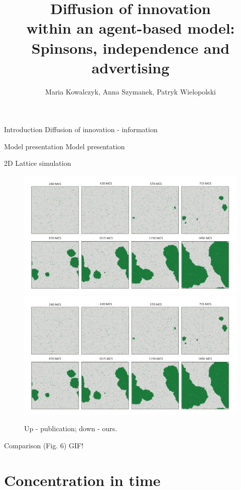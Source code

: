 \documentclass[10pt]{beamer}
\title{Diffusion of innovation \\ within an agent-based model: \\ Spinsons, independence and advertising}
\author{Maria Kowalczyk, Anna Szymanek, Patryk Wielopolski}
\institute{Wrocław Univeristy of Technology and Science}
\date{}
\begin{document}
\maketitle

\begin{frame}{Introduction}
	Diffusion of innovation - information
\end{frame}{}

\begin{frame}{Model presentation}
	Model presentation
\end{frame}

\begin{frame}{2D Lattice simulation}
	\begin{figure}
		\includegraphics[height=0.4\textheight]{../resources/images/fig6.png}
		\hfill
		\includegraphics[height=0.4\textheight]{../resources/images/fig6.png}
		\caption{Up - publication; down - ours.}
	\end{figure}
	Comparison (Fig. 6)
	GIF!
\end{frame}

\section{Concentration in time}
\end{document}

